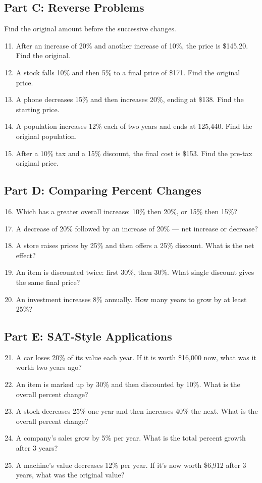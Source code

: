 \documentclass[14pt]{extarticle}
\begin{document}
\subsection*{Part C: Reverse Problems}
Find the original amount before the successive changes.
\begin{enumerate}
  \setcounter{enumi}{10}
  \item After an increase of 20\% and another increase of 10\%, the price is \$145.20. Find the original.
  \item A stock falls 10\% and then 5\% to a final price of \$171. Find the original price.
  \item A phone decreases 15\% and then increases 20\%, ending at \$138. Find the starting price.
  \item A population increases 12\% each of two years and ends at 125,440. Find the original population.
  \item After a 10\% tax and a 15\% discount, the final cost is \$153. Find the pre-tax original price.
\end{enumerate}

\subsection*{Part D: Comparing Percent Changes}
\begin{enumerate}
  \setcounter{enumi}{15}
  \item Which has a greater overall increase: 10\% then 20\%, or 15\% then 15\%?
  \item A decrease of 20\% followed by an increase of 20\% — net increase or decrease?
  \item A store raises prices by 25\% and then offers a 25\% discount. What is the net effect?
  \item An item is discounted twice: first 30\%, then 30\%. What single discount gives the same final price?
  \item An investment increases 8\% annually. How many years to grow by at least 25\%?
\end{enumerate}

\subsection*{Part E: SAT-Style Applications}
\begin{enumerate}
  \setcounter{enumi}{20}
  \item A car loses 20\% of its value each year. If it is worth \$16,000 now, what was it worth two years ago?
  \item An item is marked up by 30\% and then discounted by 10\%. What is the overall percent change?
  \item A stock decreases 25\% one year and then increases 40\% the next. What is the overall percent change?
  \item A company’s sales grow by 5\% per year. What is the total percent growth after 3 years?
  \item A machine’s value decreases 12\% per year. If it’s now worth \$6,912 after 3 years, what was the original value?
\end{enumerate}
\end{document}
